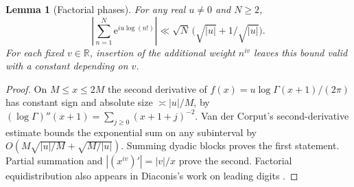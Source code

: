 \documentclass[11pt]{article}
\newtheorem{lemma}[theorem]{Lemma}
\newcommand{\R}{\mathbb R}
\newcommand{\e}{\mathrm e}
\begin{document}
\begin{lemma}[Factorial phases]\label{lem:phase}
For any real $u\ne0$ and $N\ge2$,
\[
 \left|\sum_{n=1}^{N}\e^{iu\log(n!)}\right|
 \ll \sqrt N\,\big(\sqrt{|u|}+1/\sqrt{|u|}\big).
\]
For each fixed $v\in\R$, insertion of the additional weight $n^{iv}$
leaves this bound valid with a constant depending on $v$.
\end{lemma}
\begin{proof}
On $M\le x\le2M$ the second derivative of
$f(x)=u\log\Gamma(x+1)/(2\pi)$ has constant sign and absolute size
$\asymp |u|/M$, by
$(\log\Gamma)''(x+1)=\sum_{j\ge0}(x+1+j)^{-2}$.
Van der Corput's second-derivative estimate bounds the exponential sum
on any subinterval by $O(M\sqrt{|u|/M}+\sqrt{M/|u|})$.
Summing dyadic blocks proves the first statement. Partial summation
and $|(x^{iv})'|=|v|/x$ prove the second. Factorial equidistribution
also appears in Diaconis's work on leading digits \cite{diaconis}.
\end{proof}

\newpage
\end{document}
